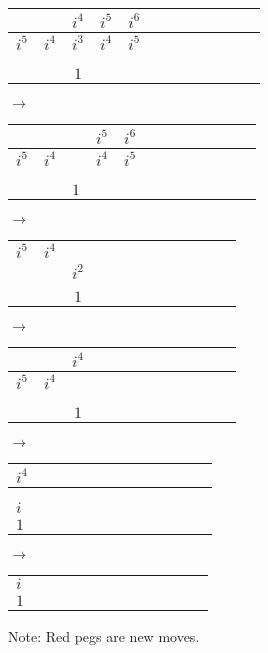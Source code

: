 \documentclass[12pt]{article}
\begin{document}
\begin{center}
\begin{tabular}{|l|c|c|c|c|c|c|c|c|c|c|r|}
    \hline
    & & $i^4$ & $i^5$ & $i^6$ \\
    \hline
    $i^5$ & $i^4$ & $i^3$ & $i^4$ & $i^5$ \\
    \hline
    & & & &\\
    \hline
    & & & &\\
    \hline
    & & $1$ & &\\
    \hline
\end{tabular}
$\longrightarrow$
\begin{tabular}{|l|c|c|c|c|c|c|c|c|c|c|r|}
    \hline
    & & & $i^5$ & $i^6$ \\
    \hline
    $i^5$ & $i^4$ & & $i^4$ & $i^5$ \\
    \hline
    & & \color{red}{$i^2$} & &\\
    \hline
    & & & &\\
    \hline
    & & $1$ & &\\
    \hline
\end{tabular}

$\longrightarrow$
\begin{tabular}{|l|c|c|c|c|c|c|c|c|c|c|r|}
    \hline
    & & \color{red}{$i^4$} \\
    \hline
    $i^5$ & $i^4$ & \color{red}{$i^3$}  \\
    \hline
    & & $i^2$ \\
    \hline
    & & \\
    \hline
    & & $1$ \\
    \hline
\end{tabular}
$\longrightarrow$
\begin{tabular}{|l|c|c|c|c|c|c|c|c|c|c|r|}
    \hline
    & & $i^4$ \\
    \hline
    $i^5$ & $i^4$ & \\
    \hline
    & & \\
    \hline
    & & \color{red}{$i$}\\
    \hline
    & & $1$ \\
    \hline
\end{tabular}
$\longrightarrow$
\begin{tabular}{|l|c|c|c|c|c|c|c|c|c|c|r|}
    \hline
    $i^4$ \\
    \hline
    \color{red}{$i^3$}  \\
    \hline
    \\
    \hline
    $i$\\
    \hline
    $1$ \\
    \hline
\end{tabular}
$\longrightarrow$
\begin{tabular}{|l|c|c|c|c|c|c|c|c|c|c|r|}
    \hline
    \color{red}{$i^2$}\\
    \hline
    $i$\\
    \hline
    $1$ \\
    \hline
\end{tabular}

\noindent *Note: Red pegs are new moves.
\end{center}
\end{document}
